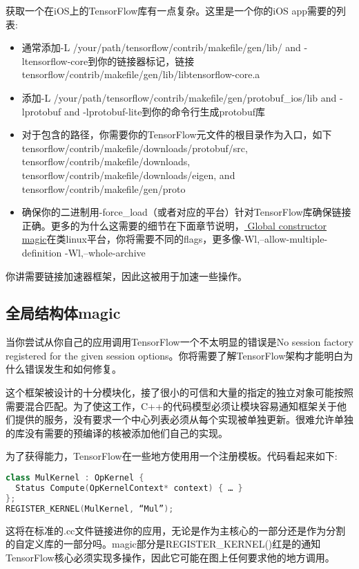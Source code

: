 获取一个在iOS上的TensorFlow库有一点复杂。这里是一个你的iOS app需要的列表:
\begin{itemize}
\item 通常添加-L /your/path/tensorflow/contrib/makefile/gen/lib/ and -ltensorflow-core到你的链接器标记，链接 tensorflow/contrib/makefile/gen/lib/libtensorflow-core.a
\item 添加-L /your/path/tensorflow/contrib/makefile/gen/protobuf\_ios/lib and -lprotobuf and -lprotobuf-lite到你的命令行生成protobuf库
\item 对于包含的路径，你需要你的TensorFlow元文件的根目录作为入口，如下tensorflow/contrib/makefile/downloads/protobuf/src, tensorflow/contrib/makefile/downloads, tensorflow/contrib/makefile/downloads/eigen, and tensorflow/contrib/makefile/gen/proto 
\item 确保你的二进制用-force\_load（或者对应的平台）针对TensorFlow库确保链接正确。更多的为什么这需要的细节在下面章节说明，\href{https://www.tensorflow.org/mobile/linking_libs?hl=zh-cn#global_constructor_magic}{ Global constructor magic}在类linux平台，你将需要不同的flags，更多像-Wl,--allow-multiple-definition -Wl,--whole-archive
\end{itemize}
你讲需要链接加速器框架，因此这被用于加速一些操作。
\subsection{全局结构体magic}
当你尝试从你自己的应用调用TensorFlow一个不太明显的错误是No session factory registered for the given session options。你将需要了解TensorFlow架构才能明白为什么错误发生和如何修复。

这个框架被设计的十分模块化，接了很小的可信和大量的指定的独立对象可能按照需要混合匹配。为了使这工作，C++的代码模型必须让模块容易通知框架关于他们提供的服务，没有要求一个中心列表必须从每个实现被单独更新。很难允许单独的库没有需要的预编译的核被添加他们自己的实现。

为了获得能力，TensorFlow在一些地方使用用一个注册模板。代码看起来如下:
\begin{lstlisting}[language=C++]
class MulKernel : OpKernel {
  Status Compute(OpKernelContext* context) { … }
};
REGISTER_KERNEL(MulKernel, “Mul”);
\end{lstlisting}
这将在标准的.cc文件链接进你的应用，无论是作为主核心的一部分还是作为分割的自定义库的一部分吗。magic部分是REGISTER\_KERNEL()红是的通知TensorFlow核心必须实现多操作，因此它可能在图上任何要求他的地方调用。

